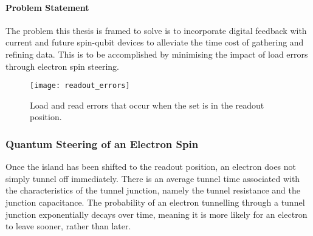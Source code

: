 		\paragraph{Problem Statement}
		\label{sec::problem_statement}
%		
		The problem this thesis is framed to solve is to incorporate digital feedback with current and future spin-qubit devices to alleviate the time cost of gathering and refining data. This is to be accomplished by minimising the impact of load errors through electron spin steering.
		
		\begin{figure}[htbp!]
			\centering
			\texttt{[image: readout\_errors]}
			\caption[Load and red errors in the \gls{set} readout position]{Load and read errors that occur when the \gls{set} is in the readout position.\cite{electron_spin_silicon}}
			\label{fig::errors}
		\end{figure}
		
	\subsubsection{Quantum Steering of an Electron Spin}
	
		Once the island has been shifted to the readout position, an electron does not simply tunnel off immediately. There is an average tunnel time associated with the characteristics of the tunnel junction, namely the tunnel resistance and the junction capacitance. The probability of an electron tunnelling through a tunnel junction exponentially decays over time, meaning it is more likely for an electron to leave sooner, rather than later. \\
		
